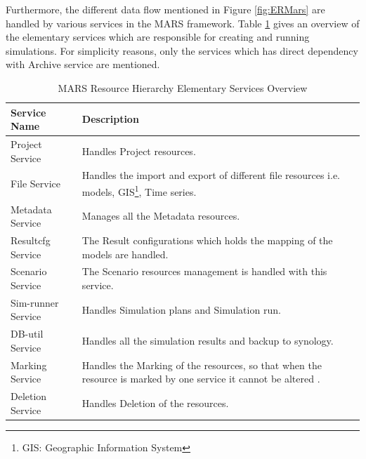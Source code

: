         \newpage
        Furthermore, the different data flow mentioned in Figure \ref{fig:ERMars} are handled by various services in the MARS framework. 
        Table \ref{table:MARS Resource Hierarchy Service Overview} gives an overview of the elementary services which are responsible for 
        creating and running simulations. For simplicity reasons, only the services
        which has direct dependency with Archive service are mentioned.
        \begin{table}[h!]
            \centering
            \begin{tabular}{|p{4cm}|p{11cm}|}
                \hline
                    \textbf{Service Name}  & \textbf{Description}\\
                \hline
                    Project Service & 
                    Handles Project resources. \\
                \hline
                    File Service
                    & Handles the import and export of different file resources i.e. models, GIS\footnote{\label{footnote:GIS}GIS: Geographic Information System}, 
                    Time series.\\
                \hline
                    Metadata Service  & Manages all the Metadata resources.\\
                \hline
                    Resultcfg Service  & The Result configurations which holds the mapping of the models are handled.\\
                \hline
                    Scenario Service  & The Scenario resources management is handled with this service.\\
                \hline
                    Sim-runner Service  & Handles Simulation plans and Simulation run.\\
                \hline
                    DB-util Service  & Handles all the simulation results and backup to synology.\\
                \hline
                    Marking Service  & Handles the Marking of the resources, so that when the resource is marked by one service it cannot be altered .\\
                \hline
                    Deletion Service  & Handles Deletion of the resources.\\
                \hline
            \end{tabular}
            \caption{MARS Resource Hierarchy Elementary Services Overview}
            \label{table:MARS Resource Hierarchy Service Overview}     
        \end{table}    